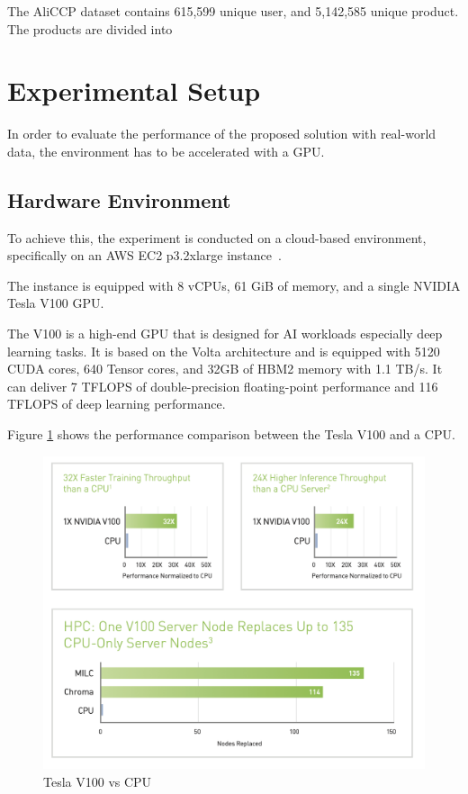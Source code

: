 The AliCCP dataset contains 615,599 unique user, and 5,142,585 unique product. The products are divided into 


\section{Experimental Setup}

In order to evaluate the performance of the proposed solution with real-world data, the environment has to be accelerated with a GPU.

\subsection{Hardware Environment}

To achieve this, the experiment is conducted on a cloud-based environment, specifically on an AWS EC2 p3.2xlarge instance~\cite{AwsEc2P3}.

The instance is equipped with 8 vCPUs, 61 GiB of memory, and a single NVIDIA Tesla V100 GPU.

The V100 is a high-end GPU that is designed for AI workloads especially deep learning tasks.
It is based on the Volta architecture and is equipped with 5120 CUDA cores, 640 Tensor cores, and 32GB of HBM2 memory with 1.1 TB/s.
It can deliver 7 TFLOPS of double-precision floating-point performance and 116 TFLOPS of deep learning performance.

Figure \ref{fig:V100vsCPU} shows the performance comparison between the Tesla V100 and a CPU.


\begin{figure}[H]
    \centering
    \includegraphics[width=\textwidth]{assets/v100-vs-cpu.png}
    \caption[Tesla V100 vs CPU]{Tesla V100 vs CPU~\cite{NvidiaV100DataSheet}}
    \label{fig:V100vsCPU}
\end{figure}

